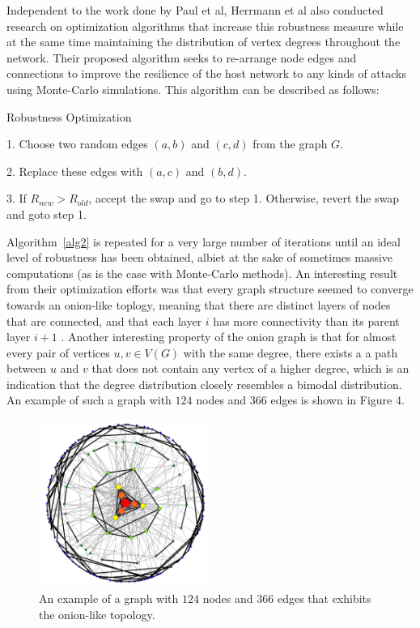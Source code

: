 \documentclass[doc]{apa}%
\begin{document}
Independent to the work done by Paul et al, Herrmann et al also conducted research on optimization algorithms that increase this robustness measure while at the same time maintaining the distribution of vertex degrees throughout the network. Their proposed algorithm seeks to re-arrange node edges and connections to improve the resilience of the host network to any kinds of attacks using Monte-Carlo simulations. This algorithm can be described as follows:
\begin{algorithm}
\caption{Robustness Optimization}
\label{alg2}
\begin{algorithmic}
	\item 1. Choose two random edges $(a,b)$ and $(c,d)$ from the graph $G$.
	\item 2. Replace these edges with $(a,c)$ and $(b,d)$.
	\item 3. If $R_{new} > R_{old}$, accept the swap and go to step 1. Otherwise, revert the swap and goto step 1. 
\end{algorithmic}
\end{algorithm}
Algorithm~\ref{alg2} is repeated for a very large number of iterations until an ideal level of robustness has been obtained, albiet at the sake of sometimes massive computations (as is the case with Monte-Carlo methods).
An interesting result from their optimization efforts was that every graph structure seemed to converge towards an onion-like toplogy, meaning that there are distinct layers of nodes that are connected, and that each layer $i$ has more connectivity than its parent layer $i+1$ \cite{Onion}. Another interesting property of the onion graph is that for almost every pair of vertices $u, v \in V(G)$ with the same degree, there exists a a path between $u$ and $v$ that does not contain any vertex of a higher degree, which is an indication that the degree distribution closely resembles a bimodal distribution. An example of such a graph with $124$ nodes and $366$ edges is shown in Figure 4.

\begin{figure}[h!]
	\label{fig:Onion}
	\centering
		\includegraphics[width=0.5\textwidth]{Onion.jpg}
	\caption{An example of a graph with $124$ nodes and $366$ edges that exhibits the onion-like topology.} %
\end{figure}
\end{document}
